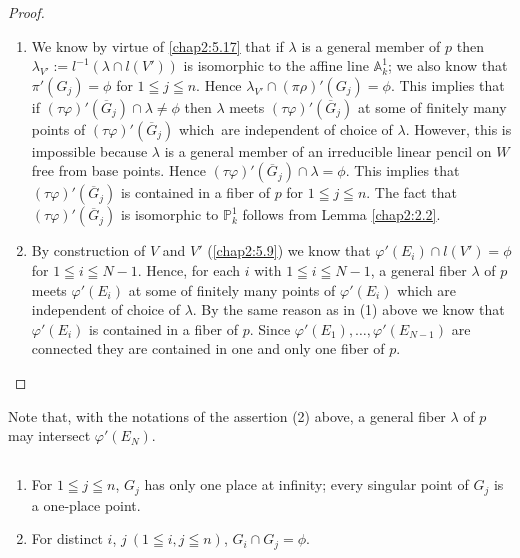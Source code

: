 \begin{proof}
\begin{enumerate}
\renewcommand{\labelenumi}{(\theenumi)}
\item We know by virtue of \ref{chap2:5.17} that if $\lambda$ is a general
  member of $p$ then $\lambda_{V'}:=l^{-1}(\lambda\cap l(V'))$ is
  isomorphic to the affine line $\mathbb{A}^{1}_{k}$; we also know
  that $\pi'(G_{j})=\phi$ for $1\leqq j\leqq n$. Hence
  $\lambda_{V'}\cap (\pi\rho)'(G_{j})=\phi$. This implies that if
  $(\tau\varphi)'(\overline{G}_{j})\cap \lambda\neq\phi$ then
  $\lambda$ meets $(\tau\varphi)'(\overline{G}_{j})$ at some of
  finitely many points of $(\tau\varphi)'(\overline{G}_{j})$
  which\pageoriginale\ are independent of choice of $\lambda$. However,
  this is impossible because $\lambda$ is a general member of an
  irreducible linear pencil on $W$ free from base points. Hence
  $(\tau\varphi)'(\overline{G}_{j})\cap\lambda=\phi$. This implies
  that $(\tau\varphi)'(\overline{G}_{j})$ is contained in a fiber of
  $p$ for $1\leqq j\leqq n$. The fact that
  $(\tau\varphi)'(\overline{G}_{j})$ is isomorphic to
  $\mathbb{P}^{1}_{k}$ follows from Lemma \ref{chap2:2.2}.

\item By construction of $V$ and $V'$ (\cf \ref{chap2:5.9}) we know that
  $\varphi'(E_{i})\cap l(V')=\phi$ for $1\leqq i\leqq N-1$. Hence, for
  each $i$ with $1\leqq i\leqq N-1$, a general fiber $\lambda$ of $p$
  meets $\varphi'(E_{i})$ at some of finitely many points of
  $\varphi'(E_{i})$ which are independent of choice of $\lambda$. By
  the same reason as in (1) above we know that $\varphi'(E_{i})$ is
  contained in a fiber of $p$. Since
  $\varphi'(E_{1}),\ldots,\varphi'(E_{N-1})$ are connected they are 
contained in one and only one fiber of $p$.
\end{enumerate}
\end{proof}

Note that, with the notations of the assertion (2) above, a general
fiber $\lambda$ of $p$ may intersect $\varphi'(E_{N})$. 

\subsection{}\label{chap2:5.21}
\begin{lemma*}
\begin{enumerate}
\renewcommand{\labelenumi}{\rm(\theenumi)}
\item For $1\leqq j\leqq n$, $G_{j}$ has only one place at infinity;
  every singular point of $G_{j}$ is a one-place point.

\item For distinct $i$, $j~(1\leqq i,j\leqq n)$, $G_{i}\cap G_{j}=\phi$.
\end{enumerate}
\end{lemma*}

